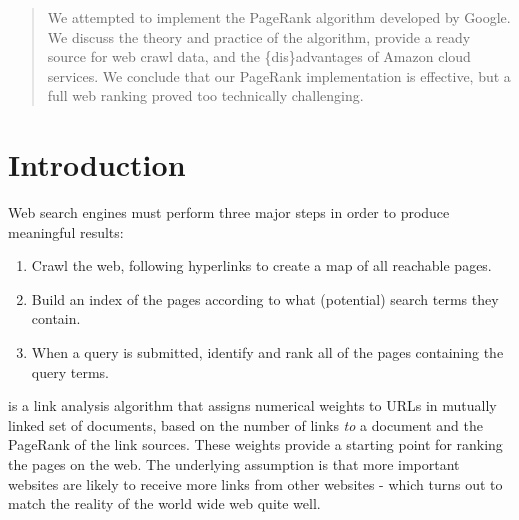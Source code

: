 \begin{abstract} 
We attempted to implement the PageRank algorithm developed by Google.  We discuss
the theory and practice of the algorithm, provide a ready source for web crawl
data, and the \{dis\}advantages of Amazon cloud services.  We conclude that our
PageRank implementation is effective, but a full web ranking proved too technically
challenging.
\end{abstract}

\section{Introduction}
Web search engines must perform three major steps in order to produce meaningful
results:
\begin{enumerate}
\item Crawl the web, following hyperlinks to create a map of all reachable pages.
\item Build an index of the pages according to what (potential) search terms they contain.
\item When a query is submitted, identify and rank all of the pages containing the query terms.
\end{enumerate}
 is a link analysis algorithm that assigns numerical weights 
to URLs in mutually linked set of documents, based on the number of links 
\emph{to} a document and the PageRank of the link sources.  These weights provide 
a starting point for ranking the pages on the web.
The underlying assumption is that more important websites are likely to receive 
more links from other websites - which turns out to match the reality
of the world wide web quite well.